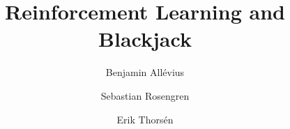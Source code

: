 \documentclass[12pt,a4paper,notitlepage,oneside]{article}
\title{Reinforcement Learning and Blackjack}
\author[1]{Benjamin Allévius}
\author[1]{Sebastian Rosengren}
\author[1]{Erik Thorsén}
\affil[1]{Department of Mathematics, Stockholm University, Sweden}
\date{\vspace{-5ex}}
\begin{document}
\maketitle

\begin{abstract} 
    
\end{abstract}
\thispagestyle{empty}
\clearpage
\setcounter{page}{1}





\end{document}
